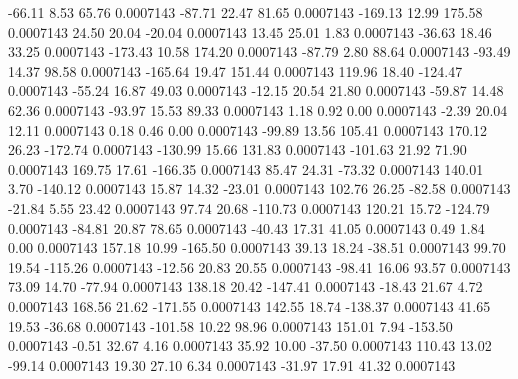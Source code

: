       -66.11        8.53       65.76     0.0007143
      -87.71       22.47       81.65     0.0007143
     -169.13       12.99      175.58     0.0007143
       24.50       20.04      -20.04     0.0007143
       13.45       25.01        1.83     0.0007143
      -36.63       18.46       33.25     0.0007143
     -173.43       10.58      174.20     0.0007143
      -87.79        2.80       88.64     0.0007143
      -93.49       14.37       98.58     0.0007143
     -165.64       19.47      151.44     0.0007143
      119.96       18.40     -124.47     0.0007143
      -55.24       16.87       49.03     0.0007143
      -12.15       20.54       21.80     0.0007143
      -59.87       14.48       62.36     0.0007143
      -93.97       15.53       89.33     0.0007143
        1.18        0.92        0.00     0.0007143
       -2.39       20.04       12.11     0.0007143
        0.18        0.46        0.00     0.0007143
      -99.89       13.56      105.41     0.0007143
      170.12       26.23     -172.74     0.0007143
     -130.99       15.66      131.83     0.0007143
     -101.63       21.92       71.90     0.0007143
      169.75       17.61     -166.35     0.0007143
       85.47       24.31      -73.32     0.0007143
      140.01        3.70     -140.12     0.0007143
       15.87       14.32      -23.01     0.0007143
      102.76       26.25      -82.58     0.0007143
      -21.84        5.55       23.42     0.0007143
       97.74       20.68     -110.73     0.0007143
      120.21       15.72     -124.79     0.0007143
      -84.81       20.87       78.65     0.0007143
      -40.43       17.31       41.05     0.0007143
        0.49        1.84        0.00     0.0007143
      157.18       10.99     -165.50     0.0007143
       39.13       18.24      -38.51     0.0007143
       99.70       19.54     -115.26     0.0007143
      -12.56       20.83       20.55     0.0007143
      -98.41       16.06       93.57     0.0007143
       73.09       14.70      -77.94     0.0007143
      138.18       20.42     -147.41     0.0007143
      -18.43       21.67        4.72     0.0007143
      168.56       21.62     -171.55     0.0007143
      142.55       18.74     -138.37     0.0007143
       41.65       19.53      -36.68     0.0007143
     -101.58       10.22       98.96     0.0007143
      151.01        7.94     -153.50     0.0007143
       -0.51       32.67        4.16     0.0007143
       35.92       10.00      -37.50     0.0007143
      110.43       13.02      -99.14     0.0007143
       19.30       27.10        6.34     0.0007143
      -31.97       17.91       41.32     0.0007143
